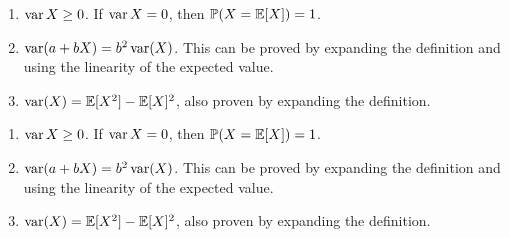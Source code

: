 \begin{note}
  \begin{field}
    \begin{thm}\leavevmode
      \begin{enumerate}
        \item $\operatorname{var} X \geq 0$. If $\operatorname{var} X = 0$, then $\mathbb{P}(X = \mathbb{E}[X]) = 1$.
        \item $\operatorname{var} (a + bX) = b^2 \operatorname{var}(X)$. This can be proved by expanding the definition and using the linearity of the expected value.
        \item $\operatorname{var}(X) = \mathbb{E}[X^2] - \mathbb{E}[X]^2$, also proven by expanding the definition.
      \end{enumerate}
    \end{thm}
  \end{field}
  \begin{field}
    \begin{thm}\leavevmode
      \begin{enumerate}
        \item $\operatorname{var} X \geq 0$. If $\operatorname{var} X = 0$, then $\mathbb{P}(X = \mathbb{E}[X]) = 1$.
        \item $\operatorname{var} (a + bX) = b^2 \operatorname{var}(X)$. This can be proved by expanding the definition and using the linearity of the expected value.
        \item $\operatorname{var}(X) = \mathbb{E}[X^2] - \mathbb{E}[X]^2$, also proven by expanding the definition.
      \end{enumerate}
    \end{thm}
  \end{field}
  \xplain{}%
\end{note}

